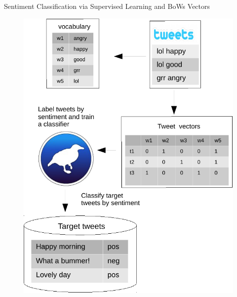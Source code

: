 \documentclass[handout]{beamer}
\begin{document}
\begin{frame}{Sentiment Classification via Supervised Learning and BoWs Vectors}

\begin{figure}[h]
        	\includegraphics[scale = 0.5]{pics/bagOfwordsClassification.pdf}
        \end{figure}

\end{frame}
\end{document}

